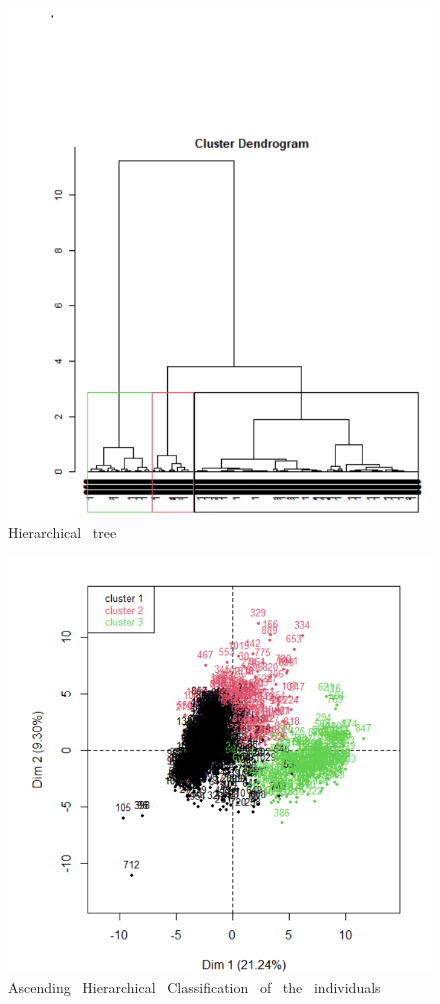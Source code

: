 \documentclass[12pt]{article}
\begin{document}
\begin{figure}[H]
\begin{center}
\includegraphics[scale=0.65]{classification_1.png} 
\caption[]{Hierarchical \ tree}
\end{center}
\end{figure}


\begin{figure}[H]
\begin{center}
\includegraphics[scale=0.7]{classification_2.png} 
\caption[]{Ascending \ Hierarchical \ Classification \ of \ the \ individuals }
\end{center}
\end{figure}
\end{document}
